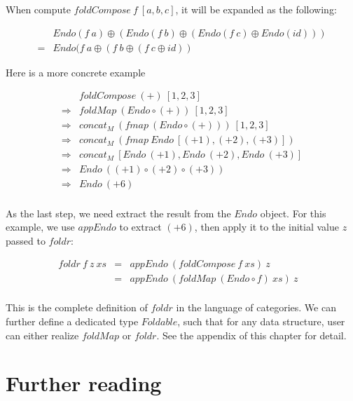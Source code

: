 \documentclass[b5paper]{article}
\begin{document}
When compute $foldCompose\ f\ [a, b, c]$, it will be expanded as the following:

\[
\begin{array}{cl}
  & Endo(f\ a) \oplus (Endo(f\ b) \oplus (Endo(f\ c) \oplus Endo(id))) \\
= & Endo(f\ a \oplus (f\ b \oplus (f\ c \oplus id))
\end{array}
\]

Here is a more concrete example

\[
\begin{array}{cl}
            & foldCompose\ (+)\ [1, 2, 3] \\
\Rightarrow & foldMap\ (Endo \circ (+))\ [1, 2, 3] \\
\Rightarrow & concat_M\ (fmap\ (Endo \circ (+)))\ [1, 2, 3] \\
\Rightarrow & concat_M\ (fmap\ Endo\ [(+1), (+2), (+3)]) \\
\Rightarrow & concat_M\ [Endo\ (+1), Endo\ (+2), Endo\ (+3)] \\
\Rightarrow & Endo\ ((+1) \circ (+2) \circ (+3)) \\
\Rightarrow & Endo\ (+6) \\
\end{array}
\]

As the last step, we need extract the result from the $Endo$ object. For this example, we use $appEndo$ to extract $(+6)$, then apply it to the initial value $z$ passed to $foldr$:

\[
\begin{array}{rcll}
foldr\ f\ z\ xs
  & = & appEndo\ (foldCompose\ f\ xs)\ z & \\
  & = & appEndo\ (foldMap\ (Endo \circ f)\ xs)\ z \\
\end{array}
\]

This is the complete definition of $foldr$ in the language of categories. We can further define a dedicated type $Foldable$, such that for any data structure, user can either realize $foldMap$ or $foldr$. See the appendix of this chapter for detail.

\section{Further reading}
\end{document}
